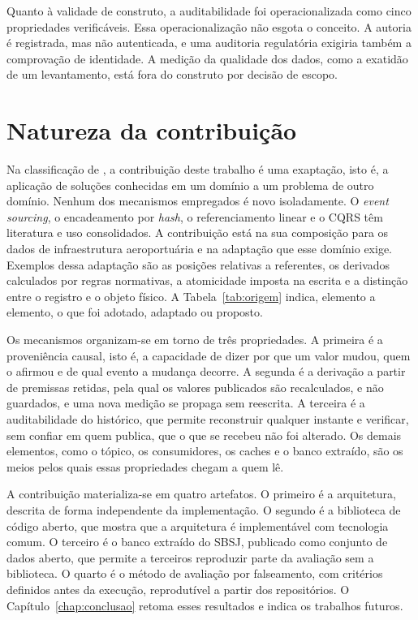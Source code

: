 Quanto à validade de construto, a auditabilidade foi operacionalizada como cinco propriedades verificáveis. Essa operacionalização não esgota o conceito. A autoria é registrada, mas não autenticada, e uma auditoria regulatória exigiria também a comprovação de identidade. A medição da qualidade dos dados, como a exatidão de um levantamento, está fora do construto por decisão de escopo.

\section{Natureza da contribuição}\label{sec:disc-contribuicao}

Na classificação de , a contribuição deste trabalho é uma exaptação, isto é, a aplicação de soluções conhecidas em um domínio a um problema de outro domínio. Nenhum dos mecanismos empregados é novo isoladamente. O \textit{event sourcing}, o encadeamento por \textit{hash}, o referenciamento linear e o CQRS têm literatura e uso consolidados. A contribuição está na sua composição para os dados de infraestrutura aeroportuária e na adaptação que esse domínio exige. Exemplos dessa adaptação são as posições relativas a referentes, os derivados calculados por regras normativas, a atomicidade imposta na escrita e a distinção entre o registro e o objeto físico. A Tabela~\ref{tab:origem} indica, elemento a elemento, o que foi adotado, adaptado ou proposto.

Os mecanismos organizam-se em torno de três propriedades. A primeira é a proveniência causal, isto é, a capacidade de dizer por que um valor mudou, quem o afirmou e de qual evento a mudança decorre. A segunda é a derivação a partir de premissas retidas, pela qual os valores publicados são recalculados, e não guardados, e uma nova medição se propaga sem reescrita. A terceira é a auditabilidade do histórico, que permite reconstruir qualquer instante e verificar, sem confiar em quem publica, que o que se recebeu não foi alterado. Os demais elementos, como o tópico, os consumidores, os caches e o banco extraído, são os meios pelos quais essas propriedades chegam a quem lê.

A contribuição materializa-se em quatro artefatos. O primeiro é a arquitetura, descrita de forma independente da implementação. O segundo é a biblioteca de código aberto, que mostra que a arquitetura é implementável com tecnologia comum. O terceiro é o banco extraído do SBSJ, publicado como conjunto de dados aberto, que permite a terceiros reproduzir parte da avaliação sem a biblioteca. O quarto é o método de avaliação por falseamento, com critérios definidos antes da execução, reprodutível a partir dos repositórios. O Capítulo~\ref{chap:conclusao} retoma esses resultados e indica os trabalhos futuros.